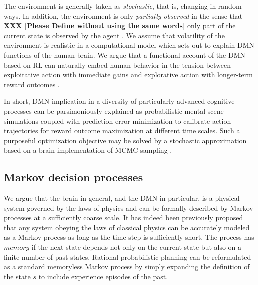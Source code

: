 \documentclass[10pt,letterpaper]{article}
\begin{document}
The environment is generally taken as \textit{stochastic},
that is, changing in random ways. In addition,
the environment is only \textit{partially observed}
in the sense that \textbf{XXX [Please Define without using the same words]}
only part of the current state is observed by
the agent \citep{starkweather2017dopamine}.
We assume that volatility of the environment
is realistic in a computational model which sets out
to explain DMN functions of the human brain.
We argue that a functional account of the DMN based on RL
can naturally embed human behavior
in the tension between exploitative action with immediate gains and
explorative action with longer-term reward outcomes
\citep{dayan2008decision}.


In short, DMN implication in a diversity of
particularly advanced cognitive processes
can be parsimoniously explained as probabilistic mental
scene simulations coupled with prediction error minimization
to calibrate action trajectories for
reward outcome maximization at different time scales.
Such a purposeful optimization objective
may be solved by a stochastic approximation
based on a brain implementation of MCMC sampling
\citep{tenenbaum2011grow}.



\subsection{Markov decision processes}
We argue that the brain in general, and the DMN in particular,
is a physical system governed by the laws of
physics and can be formally described
by Markov processes at a sufficiently coarse scale.
It has indeed been previously proposed \citep{tegmark2016improved} that
any system obeying the laws of classical physics can be accurately modeled as a Markov process as long as the time
step is sufficiently short.
The process has $memory$ if the next state depends not only on the current state
but also on a finite number of past states.
Rational probabilistic planning can be reformulated
as a standard memoryless Markov process by simply expanding the
definition of the state $s$ to include experience episodes of the past.
\end{document}
